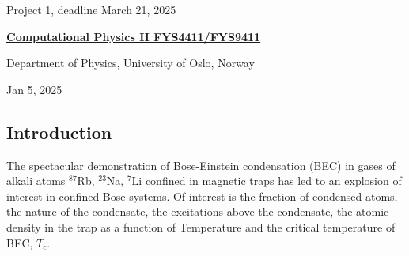 \documentclass[%
oneside,                 %
final,                   %
10pt]{article}
\begin{document}

\newcommand{\exercisesection}[1]{\subsection*{#1}}






\thispagestyle{empty}

\begin{center}
{\LARGE\bf
\begin{spacing}{1.25}
Project 1, deadline  March 21, 2025
\end{spacing}
}
\end{center}


\begin{center}
{\bf \href{{http://www.uio.no/studier/emner/matnat/fys/FYS4411/index-eng.html}}{Computational Physics II FYS4411/FYS9411}}
\end{center}

    \begin{center}
\centerline{{\small Department of Physics, University of Oslo, Norway}}
\end{center}
    

\begin{center}
Jan 5, 2025
\end{center}

\vspace{1cm}


\subsection*{Introduction}

The spectacular demonstration of Bose-Einstein condensation (BEC) in
gases of alkali atoms $^{87}$Rb, $^{23}$Na, $^7$Li confined in
magnetic traps has led to an explosion of interest in confined Bose
systems. Of interest is the fraction of condensed atoms, the nature of
the condensate, the excitations above the condensate, the atomic
density in the trap as a function of Temperature and the critical
temperature of BEC, $T_c$.
\end{document}
